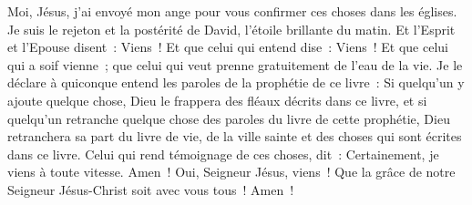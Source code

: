 \begin{multicols}{2}
Moi, Jésus, j'ai envoyé mon ange pour vous confirmer ces choses dans les églises. Je suis le rejeton et la postérité de David, l'étoile brillante du matin.
Et l'Esprit et l'Epouse disent~: Viens~! Et que celui qui entend dise~: Viens~! Et que celui qui a soif vienne~; que celui qui veut prenne gratuitement de l'eau de la vie.
Je le déclare à quiconque entend les paroles de la prophétie de ce livre~: Si quelqu'un y ajoute quelque chose, Dieu le frappera des fléaux décrits dans ce livre,
et si quelqu'un retranche quelque chose des paroles du livre de cette prophétie, Dieu retranchera sa part du livre de vie, de la ville sainte et des choses qui sont écrites dans ce livre.
Celui qui rend témoignage de ces choses, dit~: Certainement, je viens à toute vitesse. Amen~! Oui, Seigneur Jésus, viens~!
Que la grâce de notre Seigneur Jésus-Christ soit avec vous tous~! Amen~!
\PPE{}
\end{multicols}
